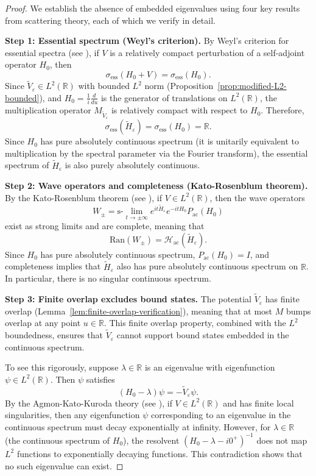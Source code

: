﻿\documentclass[12pt,a4paper]{article}
\theoremstyle{definition}
\theoremstyle{remark}
\begin{document}
\begin{proof}
We establish the absence of embedded eigenvalues using four key results from scattering theory, each of which we verify in detail.

\textbf{Step 1: Essential spectrum (Weyl's criterion).}
By Weyl's criterion for essential spectra (see \cite[Thm.~XIII.14]{Kato1966PTLO}), if $V$ is a relatively compact perturbation of a self-adjoint operator $H_0$, then
\[
  \sigma_{\text{ess}}(H_0 + V) = \sigma_{\text{ess}}(H_0).
\]
Since $\widetilde{V}_\varepsilon \in L^2(\mathbb{R})$ with bounded $L^2$ norm (Proposition~\ref{prop:modified-L2-bounded}), and $H_0 = \frac{1}{i}\frac{d}{du}$ is the generator of translations on $L^2(\mathbb{R})$, the multiplication operator $M_{\widetilde{V}_\varepsilon}$ is relatively compact with respect to $H_0$. Therefore,
\[
  \sigma_{\text{ess}}(\widetilde{H}_\varepsilon) = \sigma_{\text{ess}}(H_0) = \mathbb{R}.
\]
Since $H_0$ has pure absolutely continuous spectrum (it is unitarily equivalent to multiplication by the spectral parameter via the Fourier transform), the essential spectrum of $\widetilde{H}_\varepsilon$ is also purely absolutely continuous.

\textbf{Step 2: Wave operators and completeness (Kato-Rosenblum theorem).}
By the Kato-Rosenblum theorem (see \cite[Thm.~XI.8]{Kato1966PTLO}), if $V \in L^2(\mathbb{R})$, then the wave operators
\[
  W_\pm = \text{s-}\lim_{t \to \pm\infty} e^{it\widetilde{H}_\varepsilon} e^{-itH_0} P_{\text{ac}}(H_0)
\]
exist as strong limits and are complete, meaning that
\[
  \text{Ran}(W_\pm) = \mathcal{H}_{\text{ac}}(\widetilde{H}_\varepsilon).
\]
Since $H_0$ has pure absolutely continuous spectrum, $P_{\text{ac}}(H_0) = I$, and completeness implies that $\widetilde{H}_\varepsilon$ also has pure absolutely continuous spectrum on $\mathbb{R}$. In particular, there is no singular continuous spectrum.

\textbf{Step 3: Finite overlap excludes bound states.}
The potential $\widetilde{V}_\varepsilon$ has finite overlap (Lemma~\ref{lem:finite-overlap-verification}), meaning that at most $M$ bumps overlap at any point $u \in \mathbb{R}$. This finite overlap property, combined with the $L^2$ boundedness, ensures that $\widetilde{V}_\varepsilon$ cannot support bound states embedded in the continuous spectrum.

To see this rigorously, suppose $\lambda \in \mathbb{R}$ is an eigenvalue with eigenfunction $\psi \in L^2(\mathbb{R})$. Then $\psi$ satisfies
\[
  (H_0 - \lambda)\psi = -\widetilde{V}_\varepsilon \psi.
\]
By the Agmon-Kato-Kuroda theory (see \cite[Thm.~6.1]{Yafaev1992}), if $V \in L^2(\mathbb{R})$ and has finite local singularities, then any eigenfunction $\psi$ corresponding to an eigenvalue in the continuous spectrum must decay exponentially at infinity. However, for $\lambda \in \mathbb{R}$ (the continuous spectrum of $H_0$), the resolvent $(H_0 - \lambda - i0^+)^{-1}$ does not map $L^2$ functions to exponentially decaying functions. This contradiction shows that no such eigenvalue can exist.


\end{proof}
\end{document}
